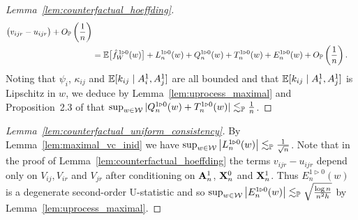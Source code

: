 \begin{proof}[Lemma~\ref{lem:counterfactual_hoeffding}]
\begin{align*}
    \big(v_{i j r} - u_{i j r}\big)
    + O_{\mathbb{P}}\left( \frac{1}{n} \right) \\
    &=
    \mathbb{E}\big[\hat f_W^{\,1 \triangleright 0}(w) \big]
    + L_n^{1 \triangleright 0}(w)
    + Q_n^{1 \triangleright 0}(w)
    + T_n^{1 \triangleright 0}(w)
    + E_n^{1 \triangleright 0}(w)
    + O_{\mathbb{P}}\left( \frac{1}{n} \right).
  \end{align*}
  Noting that $\psi_i$, $\kappa_{i j}$
  and $\mathbb{E}[k_{i j} \mid A_i^1, A_j^1]$
  are all bounded and that
  $\mathbb{E}[k_{i j} \mid A_i^1, A_j^1]$
  is Lipschitz in $w$,
  we deduce by
  Lemma~\ref{lem:uprocess_maximal}
  and Proposition~2.3 of
  \citet{arcones1993limit} that
  $\sup_{w \in \mathcal{W}} |Q_n^{1 \triangleright 0}(w)
  + T_n^{1 \triangleright 0}(w)| \lesssim_{\mathbb{P}} \frac 1n$.
\end{proof}

\begin{proof}[Lemma~\ref{lem:counterfactual_uniform_consistency}]

  By Lemma~\ref{lem:maximal_vc_inid} we have
  $\sup_{w \in \mathcal{W}} \big|L_n^{1 \triangleright 0}(w)\big|
  \lesssim_{\mathbb{P}} \frac{1}{\sqrt n}$.
  Note that in the proof of Lemma~\ref{lem:counterfactual_hoeffding}
  the terms $v_{i j r} - u_{i j r}$ depend only on $V_{i j}, V_{i r}$ and
  $V_{jr}$
  after conditioning on $\mathbf{A}_n^1$, $\mathbf{X}_n^0$ and $\mathbf{X}_n^1$.
  Thus $E_n^{1 \triangleright 0}(w)$ is a degenerate second-order
  U-statistic and so
  $\sup_{w \in \mathcal{W}} \big|E_n^{1 \triangleright 0}(w)\big|
  \lesssim_{\mathbb{P}} \sqrt{\frac{\log n}{n^2h}}$
  by Lemma~\ref{lem:uprocess_maximal}.
\end{proof}

